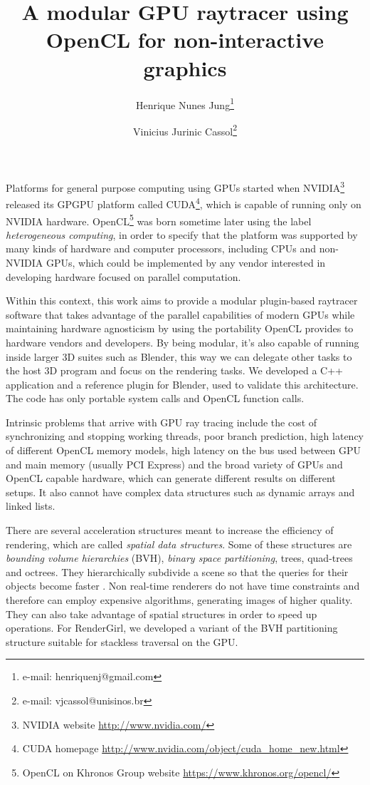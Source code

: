 \documentclass{vgtc}
\title{A modular GPU raytracer using OpenCL for non-interactive graphics}
\author{Henrique Nunes Jung\thanks{e-mail: henriquenj@gmail.com}
\and Vinicius Jurinic Cassol\thanks{e-mail: vjcassol@unisinos.br}}
\affiliation{\scriptsize Universidade do Vale do Rio dos Sinos}
\begin{document}

\maketitle

Platforms for general purpose computing using GPUs started when
NVIDIA\footnote{NVIDIA website \url{http://www.nvidia.com/}} released
its GPGPU platform called CUDA\footnote{CUDA homepage
 \url{http://www.nvidia.com/object/cuda_home_new.html}}, which is
capable of running only on NVIDIA hardware. OpenCL\footnote{OpenCL on
 Khronos Group website \url{https://www.khronos.org/opencl/}} was
born sometime later using the label \emph{heterogeneous computing}, in
order to specify that the platform was supported by many kinds of
hardware and computer processors, including CPUs and non-NVIDIA GPUs,
which could be implemented by any vendor interested in developing
hardware focused on parallel computation.

Within this context, this work aims to provide a modular plugin-based
raytracer software that takes advantage of the parallel capabilities
of modern GPUs while maintaining hardware agnosticism by using the
portability OpenCL provides to hardware vendors and developers. By
being modular, it's also capable of running inside larger 3D suites
such as Blender, this way we can delegate other tasks to the host 3D
program and focus on the rendering tasks. We developed a C++
application and a reference plugin for Blender, used to validate this
architecture. The code has only portable system calls and OpenCL
function calls.

Intrinsic problems that arrive with GPU ray tracing include the cost
of synchronizing and stopping working threads, poor branch prediction,
high latency of different OpenCL memory models, high latency on the
bus used between GPU and main memory (usually PCI Express) and the
broad variety of GPUs and OpenCL capable hardware, which can generate
different results on different setups. It also cannot have complex data
structures such as dynamic arrays and linked lists.

There are several acceleration structures meant to increase the efficiency
of rendering, which are called \emph{spatial data structures}. Some of
these structures are \emph{bounding volume hierarchies} (BVH),
\emph{binary space partitioning}, trees, quad-trees and octrees. They
hierarchically subdivide a scene so that the queries for their objects
become faster \cite[Chapter~14.1]{akenine-moller:2008}. Non real-time
renderers do not have time constraints and therefore can employ
expensive algorithms, generating images of higher quality. They can also
take advantage of spatial structures in order to speed up
operations. For RenderGirl, we developed a variant of the BVH
partitioning structure suitable for stackless traversal on the GPU.
\end{document}
